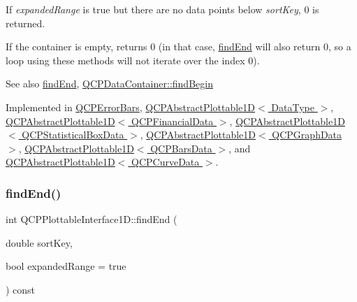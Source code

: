 If {\itshape expanded\+Range} is true but there are no data points below {\itshape sort\+Key}, 0 is returned.

If the container is empty, returns 0 (in that case, \hyperlink{class_q_c_p_plottable_interface1_d_a5deced1016bc55a41a2339619045b295}{find\+End} will also return 0, so a loop using these methods will not iterate over the index 0).

\begin{DoxySeeAlso}{See also}
\hyperlink{class_q_c_p_plottable_interface1_d_a5deced1016bc55a41a2339619045b295}{find\+End}, \hyperlink{class_q_c_p_data_container_a2ad8a5399072d99a242d3a6d2d7e278a}{Q\+C\+P\+Data\+Container\+::find\+Begin} 
\end{DoxySeeAlso}


Implemented in \hyperlink{class_q_c_p_error_bars_a5c74b510f1d7254263ec18cd3a359a07}{Q\+C\+P\+Error\+Bars}, \hyperlink{class_q_c_p_abstract_plottable1_d_ae6ead74a0d6a17954e1857f361b9ccf2}{Q\+C\+P\+Abstract\+Plottable1\+D$<$ Data\+Type $>$}, \hyperlink{class_q_c_p_abstract_plottable1_d_ae6ead74a0d6a17954e1857f361b9ccf2}{Q\+C\+P\+Abstract\+Plottable1\+D$<$ Q\+C\+P\+Financial\+Data $>$}, \hyperlink{class_q_c_p_abstract_plottable1_d_ae6ead74a0d6a17954e1857f361b9ccf2}{Q\+C\+P\+Abstract\+Plottable1\+D$<$ Q\+C\+P\+Statistical\+Box\+Data $>$}, \hyperlink{class_q_c_p_abstract_plottable1_d_ae6ead74a0d6a17954e1857f361b9ccf2}{Q\+C\+P\+Abstract\+Plottable1\+D$<$ Q\+C\+P\+Graph\+Data $>$}, \hyperlink{class_q_c_p_abstract_plottable1_d_ae6ead74a0d6a17954e1857f361b9ccf2}{Q\+C\+P\+Abstract\+Plottable1\+D$<$ Q\+C\+P\+Bars\+Data $>$}, and \hyperlink{class_q_c_p_abstract_plottable1_d_ae6ead74a0d6a17954e1857f361b9ccf2}{Q\+C\+P\+Abstract\+Plottable1\+D$<$ Q\+C\+P\+Curve\+Data $>$}.

\mbox{\label{class_q_c_p_plottable_interface1_d_a5deced1016bc55a41a2339619045b295}} 
\subsubsection{\texorpdfstring{find\+End()}{findEnd()}}
{\footnotesize\ttfamily int Q\+C\+P\+Plottable\+Interface1\+D\+::find\+End (\begin{DoxyParamCaption}\item[{double}]{sort\+Key,  }\item[{bool}]{expanded\+Range = {\ttfamily true} }\end{DoxyParamCaption}) const\hspace{0.3cm}{\ttfamily [pure virtual]}}


